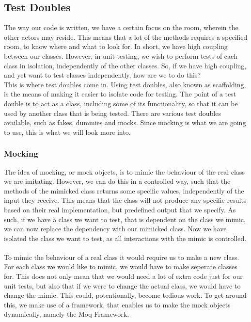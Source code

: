 \subsection{Test Doubles}
The way our code is written, we have a certain focus on the room, wherein the other actors may reside. This means that a lot of the methods requires a specified room, to know where and what to look for. In short, we have high coupling between our classes. However, in unit testing, we wish to perform tests of each class in isolation, independently of the other classes. So, if we have high coupling, and yet want to test classes independently, how are we to do this? \\ This is where test doubles come in. Using test doubles, also known as scaffolding, is the means of making it easier to isolate code for testing. The point of a test double is to act as a class, including some of its functionality, so that it can be used by another class that is being tested\cite{TestingCodeComplete}. There are various test doubles available, such as fakes, dummies and mocks. Since mocking is what we are going to use, this is what we will look more into.

\subsubsection{Mocking}
The idea of mocking, or mock objects, is to mimic the behaviour of the real class we are imitating. However, we can do this in a controlled way, such that the methods of the mimicked class returns some specific values, independently of the input they receive. This means that the class will not produce any specific results based on their real implementation, but predefined output that we specify\cite{TestingAdaptiveCode}. As such, if we have a class we want to test, that is dependent on the class we mimic, we can now replace the dependency with our mimicked class. Now we have isolated the class we want to test, as all interactions with the mimic is controlled. \\
\\
To mimic the behaviour of a real class it would require us to make a new class. For each class we would like to mimic, we would have to make seperate classes for. This does not only mean that we would need a lot of extra code just for our unit tests, but also that if we were to change the actual class, we would have to change the mimic. This could, potentionally, become tedious work. To get around this, we make use of a framework, that enables us to make the mock objects dynamically, namely the Moq Framework.

